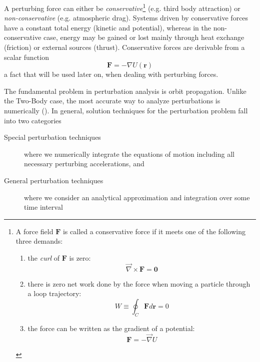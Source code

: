 A perturbing force can either be \emph{conservative}\footnote{
A force field $\bm{F}$ is called a conservative force if it meets one of the 
following three demands:
  \begin{enumerate}
    \item the \emph{curl} of $\bm{F}$ is zero:\begin{equation}\vec{\nabla} \times \bm{F} = \bm{0}\end{equation}
    \item there is zero net work done by the force when moving a particle 
      through a loop trajectory:\begin{equation}W \equiv \oint _C \bm{F}d\bm{r}=0 \end{equation}
    \item the force can be written as the gradient of a potential:\begin{equation}\bm{F}=-\vec{\nabla} U\end{equation}
  \end{enumerate}
} (e.g. third body attraction) or \emph{non-conservative} (e.g. atmospheric drag). 
Systems driven by conservative forces have a constant total energy (kinetic and potential), 
whereas in the non-conservative case, energy may be gained or lost mainly through 
heat exchange (friction) or external sources (thrust). Conservative forces are 
derivable from a scalar function
\begin{equation}
  \bm{F} = -\nabla U(\bm{r})
\end{equation}
a fact that will be used later on, when dealing with perturbing forces.

The fundamental problem in perturbation analysis is orbit propagation. Unlike the 
Two-Body case, the most accurate way to analyze perturbations is numerically (\cite{Vallado}).
In general, solution techniques for the perturbation problem fall into two categories 
\begin{description}
  \item[Special perturbation techniques] where we numerically integrate the equations 
  of motion including all necessary perturbing accelerations, and
  \item[General perturbation techniques] where we consider an analytical approximation and 
  integration over some time interval
\end{description}

